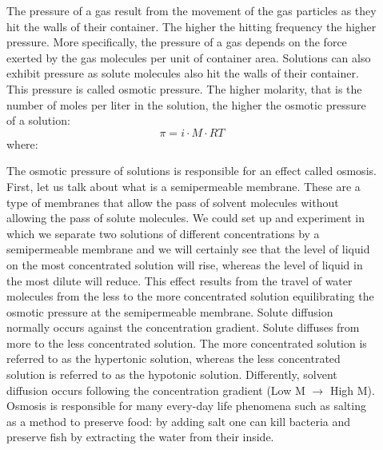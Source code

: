 \documentclass[main.tex]{subfiles}
\newcommand\chapterlabel{Ch-solutions}\setcounter{figurenewcounter}{0}\setcounter{tablenewcounter}{0}\setcounter{formulanewcounter}{0}
\begin{document}
\begin{description}
\item[] 
The pressure of a gas result from the movement of the gas particles as they hit the walls of their container. The higher the hitting frequency the higher pressure. More specifically, the pressure of a gas depends on the force exerted by the gas molecules per unit of container area. Solutions can also exhibit pressure as solute molecules also hit the walls of their container. This pressure is called osmotic pressure. The higher molarity, that is the number of moles per liter in the solution, the higher the osmotic pressure of a solution:
\begin{equation}
\boxed{ \pi=i\cdot M\cdot RT 	}
\label{\chapterlabel:equation13}
\end{equation}
where:
The osmotic pressure of solutions is responsible for an effect called osmosis. First, let us talk about what is a semipermeable membrane. These are a type of membranes that allow the pass of solvent molecules without allowing the pass of solute molecules. 
We could set up and experiment in which we separate two solutions of different concentrations by a semipermeable membrane and we will certainly see that the level of liquid on the most concentrated solution will rise, whereas the level of liquid in the most dilute will reduce. 
This effect results from the travel of water molecules from the less to the more concentrated solution equilibrating the osmotic pressure at the semipermeable membrane. 
Solute diffusion normally occurs against the concentration gradient. Solute diffuses from more to the less concentrated solution. The more concentrated solution is referred to as the hypertonic solution, whereas the less concentrated solution is referred to as the hypotonic solution.
Differently, solvent diffusion occurs following the concentration gradient (Low M $\rightarrow$ High M). Osmosis is responsible for many every-day life phenomena such as salting as a method to preserve food: by adding salt one can kill bacteria and preserve fish by extracting the water from their inside.  


\end{description}
\end{document}
